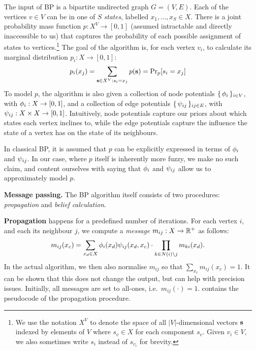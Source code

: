 \documentclass[draft,letterpaper]{article}
\newcommand{\mypar}[1]{{\bf #1.}}
\newcommand{\myparcont}[1]{{\bf #1}}
\begin{document}
The input of BP is a bipartite undirected graph $G = (V, E)$. Each of the
vertices $v\in V$ can be in one of $S$ \emph{states}, labelled $x_1, \ldots,
x_S \in X$. There is a joint probability mass function $p: X^V \to [0, 1]$
(assumed intractable and directly inaccessible to us) that captures the probability of
each possible assignment of states to vertices.\footnote{We use the notation
$X^V$ to denote the space of all $|V|$-dimensional vectors $\ves$ indexed by
elements of $V$ where $s_v\in X$ for each component $s_v$. Given $v_i \in V$, we
also sometimes write $s_i$ instead of $s_{v_i}$ for brevity.} The goal of the
algorithm is, for each vertex $v_i$, to calculate its marginal distribution
$p_i: X \to [0, 1]$:
%
$$p_i(x_j) = \sum_{\ves \in X^V: s_i = x_j} p(\ves) = \Pr_p[s_i = x_j]$$
%
To model $p$, the algorithm is also given a collection of node potentials
$\{\,\phi_i\,\}_{i \in V}$, with $\phi_i: X \to [0, 1]$, and a collection of edge
potentials $\{\,\psi_{ij}\,\}_{ij \in E}$, with $\psi_{ij}: X\times X \to [0, 1]$.
Intuitively, node potentials capture our priors about which states each vertex
inclines to, while the edge potentials capture the influence the state of a
vertex has on the state of its neighbours.

In classical BP, it is assumed that $p$ can be explicitly expressed in terms of
$\phi_i$ and $\psi_{ij}$. In our case, where $p$ itself is inherently more
fuzzy, we make no such claim, and content ourselves with saying that $\phi_i$
and $\psi_{ij}$ allow us to approximately model $p$.

\mypar{Message passing} The BP algorithm itself consists of two
procedures: \emph{propagation} and \emph{belief calculation}.

\myparcont{Propagation} happens for a predefined number of iterations. For each vertex $i$, and each its neighbour $j$, we compute a \emph{message} $m_{ij} : X \to \mathbb{R}^+$ as follows:
%
$$m_{ij}(x_c) = \sum_{x_d \in X} \phi_i(x_d)\psi_{ij}(x_d, x_c) \cdot \prod_{k \in N(i) \setminus j} m_{ki}(x_d).$$
%
In the actual algorithm, we then also normalise $m_{ij}$ so that $\sum_{x_c}
m_{ij}(x_c) = 1$. It can be shown that this does not change the output, but can
help with precision issues. Initially, all messages are set to all-ones,
i.e.~$m_{ij}(\cdot) = 1$.
%
 contains the pseudocode of the propagation procedure.
\end{document}
